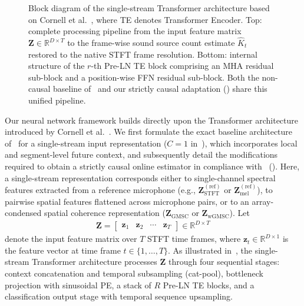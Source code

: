 \documentclass[lettersize,journal]{IEEEtran}
\begin{document}
\begin{figure}[t]
{%
  }
  \caption{Block diagram of the single-stream Transformer architecture based on Cornell et al.~\cite{cornell2022overlapped}, where \acrshort{TE} denotes Transformer Encoder. Top: complete processing pipeline from the input feature matrix $\mathbf{Z} \in \mathbb{R}^{D \times T}$ to the frame-wise sound source count estimate $\widehat{K}_t$ restored to the native \acrshort{STFT} frame resolution. Bottom: internal structure of the $r$-th Pre-\acrshort{LN} \acrshort{TE} block comprising an \acrshort{MHA} residual sub-block and a position-wise \acrshort{FFN} residual sub-block. Both the non-causal baseline of~\cite{cornell2022overlapped} and our strictly causal adaptation () share this unified pipeline.}
  \label{fig:transformer_architecture}
\end{figure}

Our neural network framework builds directly upon the Transformer architecture introduced by Cornell et al.~\cite{cornell2022overlapped}. We first formulate the exact baseline architecture of~\cite{cornell2022overlapped} for a single-stream input representation ($C = 1$ in~), which incorporates local and segment-level future context, and subsequently detail the modifications required to obtain a strictly causal online estimator in compliance with~ (). Here, a single-stream representation corresponds either to single-channel spectral features extracted from a reference microphone (e.g., $\mathbf{Z}_{\mathrm{STFT}}^{(\mathrm{ref})}$ or $\mathbf{Z}_{\mathrm{mel}}^{(\mathrm{ref})}$), to pairwise spatial features flattened across microphone pairs, or to an array-condensed spatial coherence representation ($\mathbf{Z}_{\mathrm{GMSC}}$ or $\mathbf{Z}_{\mathrm{wGMSC}}$). Let
\begin{align}
  \mathbf{Z} = \begin{bmatrix} \mathbf{z}_1 & \mathbf{z}_2 & \cdots & \mathbf{z}_T \end{bmatrix} \in \mathbb{R}^{D \times T}
  \label{eq:single_stream_input}
\end{align}
denote the input feature matrix over $T$ \gls{STFT} time frames, where $\mathbf{z}_t \in \mathbb{R}^{D \times 1}$ is the feature vector at time frame $t \in \{1, \dots, T\}$. As illustrated in~, the single-stream Transformer architecture processes $\mathbf{Z}$ through four sequential stages: context concatenation and temporal subsampling (cat-pool), bottleneck projection with sinusoidal \gls{PE}, a stack of $R$ Pre-\gls{LN} \gls{TE} blocks, and a classification output stage with temporal sequence upsampling.
\end{document}
